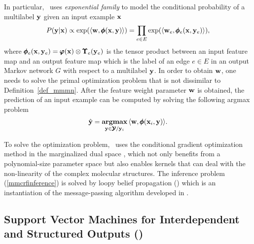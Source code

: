 {In particular, \mmcrf\ uses \textit{exponential family} to model the conditional probability of a multilabel $\mathbf {y}$ given an input example $\mathbf {x}$
\begin{align*}
	P(\mathbf {y}|\mathbf {x}) \propto \exp(\langle \mathbf {w}, \pmb \phi(\mathbf {x},\mathbf {y}) \rangle) = \prod_{e\in E}\exp(\langle \mathbf {w}_e, \pmb \phi_e(\mathbf {x},\mathbf {y}_e) \rangle),
\end{align*}
where $\pmb \phi_e(\mathbf {x},\mathbf {y}_e)=\pmb \varphi(\mathbf {x})\otimes\pmb \Upsilon_e(\mathbf {y}_e)$ is the tensor product between an input feature map and an output feature map which is the label of an edge $e\in E$ in an output Markov network $G$ with respect to a multilabel $\mathbf {y}$. 
In order to obtain $\mathbf {w}$, one needs to solve the primal optimization problem that is not dissimilar to Definition~\ref{def_mmmn}.
After the feature weight parameter $\mathbf {w}$ is obtained, the prediction of an input example can be computed by solving the following argmax problem
\begin{align}
	\hat{\mathbf {y}} = \underset{\mathbf {y}\in\pmb {\mathcal{Y}}/\mathbf {y}_i}{\textbf{argmax}} \, \langle \mathbf {w}, \pmb \phi(\mathbf {x}_i,\mathbf {y}) \rangle.\label{mmcrfinference}
\end{align}

To solve the optimization problem, \mmcrf\ uses the conditional gradient optimization method \citep{Bertsekas95nonlinear} in the marginalized dual space \citep{Taskar04max}, which not only benefits from a polynomial-size parameter space but also enables kernels that can deal with the non-linearity of the complex molecular structures.
The inference problem (\ref{mmcrfinference}) is solved by loopy belief propagation (\lbp) which is an instantiation of the message-passing algorithm developed in \citep{Wainwright08graphical}.



%
% 
\subsection{Support Vector Machines for Interdependent and Structured Outputs (\svmstruct)} \label{sc_svmstruct}

}
